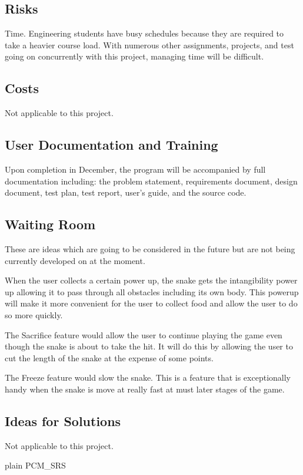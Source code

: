 \documentclass[12pt]{article}
\newcounter{goalnum} %
\begin{document}
\subsection{Risks}
	Time. Engineering students have busy schedules because they are required to take a heavier course load. With numerous other assignments, projects, and test going on concurrently with this project, managing time will be difficult. 
\subsection{Costs}
	Not applicable to this project.

\subsection{User Documentation and Training}
	Upon completion in December, the program will be accompanied by full documentation including: the problem statement, requirements document, design document, test plan, test report, user's guide, and the source code. 
\subsection{Waiting Room}
	These are ideas which are going to be considered in the future but are not being currently developed on at the moment.

	When the user collects a certain power up, the snake gets the intangibility power up allowing it to pass through all obstacles including its own body. This powerup will make it more convenient for the user to collect food and allow the user to do so more quickly.

	The Sacrifice feature would allow the user to continue playing the game even though the snake is about to take the hit. It will do this by allowing the user to cut the length of the snake at the expense of some points.

	The Freeze feature would slow the snake. This is a feature that is exceptionally handy when the snake is move at really fast at must later stages of the game.
\subsection{Ideas for Solutions}
	Not applicable to this project.





 {plain}
 {PCM_SRS}
\end{document}
